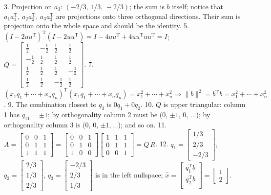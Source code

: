 3. Projection on \(a_{3}\): \((-2/3,\,1/3,\,-2/3)\); the sum is \(b\) itself; notice that \(a_{1}a_{1}^{\mathrm{T}},\,a_{2}a_{2}^{\mathrm{T}},\,a_{3}a_{3}^{\mathrm{T}}\) are projections onto three orthogonal directions. Their sum is projection onto the whole space and should be the identity.
5. \((I-2uu^{\mathrm{T}})^{\mathrm{T}}(I-2uu^{\mathrm{T}})=I-4uu^{\mathrm{T}}+4uu^{ \mathrm{T}}uu^{\mathrm{T}}=I\); \(Q=\begin{bmatrix}\frac{1}{2}&-\frac{1}{2}&\frac{1}{2}&\frac{1}{2}\\ -\frac{1}{2}&\frac{1}{2}&\frac{1}{2}&\frac{1}{2}\\ \frac{1}{2}&\frac{1}{2}&\frac{1}{2}&-\frac{1}{2}\\ \frac{1}{2}&\frac{1}{2}&-\frac{1}{2}&\frac{1}{2}\end{bmatrix}\).
7. \((x_{1}q_{1}+\cdots+x_{n}q_{n})^{\mathrm{T}}(x_{1}q_{1}+\cdots+x_{n}q_{n})=x_{1 }^{2}+\cdots+x_{n}^{2}\Rightarrow\|b\|^{2}=b^{\mathrm{T}}b=x_{1}^{2}+\cdots+x_ {n}^{2}\).
9. The combination closest to \(q_{3}\) is \(0q_{1}+0q_{2}\).
10. \(Q\) is upper triangular: column 1 has \(q_{11}=\pm 1\); by orthogonality column 2 must be (0, \(\pm 1\), 0, \(\ldots\)); by orthogonality column 3 is (0, 0, \(\pm 1,\ldots\)); and so on.
11. \(A=\begin{bmatrix}0&0&1\\ 0&1&1\\ 1&1&1\end{bmatrix}=\begin{bmatrix}0&0&1\\ 0&1&0\\ 1&0&0\end{bmatrix}\begin{bmatrix}1&1&1\\ 0&1&1\\ 0&0&1\end{bmatrix}=Q\,R\).
12. \(q_{1}=\begin{bmatrix}1/3\\ 2/3\\ -2/3\end{bmatrix}\), \(q_{2}=\begin{bmatrix}2/3\\ 1/3\\ 2/3\end{bmatrix}\), \(q_{3}=\begin{bmatrix}-2/3\\ 2/3\\ 1/3\end{bmatrix}\) is in the left nullspace; \(\widehat{x}=\begin{bmatrix}q_{1}^{\mathrm{T}}b\\ q_{2}^{\mathrm{T}}b\\ \end{bmatrix}=\begin{bmatrix}1\\ 2\end{bmatrix}\).
